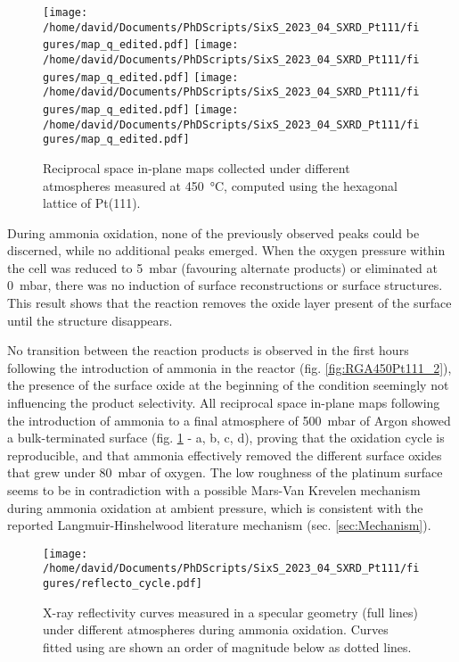 \begin{figure}[!htb]
    \centering
    \texttt{[image: /home/david/Documents/PhDScripts/SixS\_2023\_04\_SXRD\_Pt111/figures/map\_q\_edited.pdf]}
    \texttt{[image: /home/david/Documents/PhDScripts/SixS\_2023\_04\_SXRD\_Pt111/figures/map\_q\_edited.pdf]}
    \texttt{[image: /home/david/Documents/PhDScripts/SixS\_2023\_04\_SXRD\_Pt111/figures/map\_q\_edited.pdf]}
    \texttt{[image: /home/david/Documents/PhDScripts/SixS\_2023\_04\_SXRD\_Pt111/figures/map\_q\_edited.pdf]}
    \caption{
        Reciprocal space in-plane maps collected under different atmospheres measured at \qty{450}{\degreeCelsius}, computed using the hexagonal lattice of Pt(111).
    }
    \label{fig:MapsPt111B}
\end{figure}

During ammonia oxidation, none of the previously observed peaks could be discerned, while no additional peaks emerged.
When the oxygen pressure within the cell was reduced to \qty{5}{\milli\bar} (favouring alternate products) or eliminated at \qty{0}{\milli\bar}, there was no induction of surface reconstructions or surface structures.
This result shows that the reaction removes the oxide layer present of the surface until the structure disappears.

No transition between the reaction products is observed in the first hours following the introduction of ammonia in the reactor (fig. \ref{fig:RGA450Pt111_2}), the presence of the surface oxide at the beginning of the condition seemingly not influencing the product selectivity.
All reciprocal space in-plane maps following the introduction of ammonia to a final atmosphere of \qty{500}{\milli\bar} of Argon showed a bulk-terminated surface (fig. \ref{fig:MapsPt111B} - a, b, c, d), proving that the oxidation cycle is reproducible, and that ammonia effectively removed the different surface oxides that grew under \qty{80}{\milli\bar} of oxygen.
The low roughness of the platinum surface seems to be in contradiction with a possible Mars-Van Krevelen mechanism during ammonia oxidation at ambient pressure, which is consistent with the reported Langmuir-Hinshelwood literature mechanism (sec. \ref{sec:Mechanism}).

\begin{figure}[!htb]
    \centering
    \texttt{[image: /home/david/Documents/PhDScripts/SixS\_2023\_04\_SXRD\_Pt111/figures/reflecto\_cycle.pdf]}
    \caption{
    	X-ray reflectivity curves measured in a specular geometry (full lines) under different atmospheres during ammonia oxidation.
    	Curves fitted using  are shown an order of magnitude below as dotted lines.
    }
    \label{fig:ReflectoCycle}
\end{figure}

